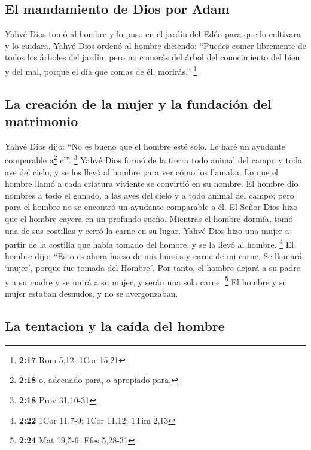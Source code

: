 \hypertarget{el-mandamiento-de-dios-por-adam}{%
\subsection{El mandamiento de Dios por
Adam}\label{el-mandamiento-de-dios-por-adam}}

 Yahvé Dios tomó al hombre y lo puso en el jardín del
Edén para que lo cultivara y lo cuidara.  Yahvé Dios
ordenó al hombre diciendo: ``Puedes comer libremente de todos los
árboles del jardín;  pero no comerás del árbol del
conocimiento del bien y del mal, porque el día que comas de él,
morirás.'' \footnote{\textbf{2:17} Rom 5,12; 1Cor 15,21}

\hypertarget{la-creaciuxf3n-de-la-mujer-y-la-fundaciuxf3n-del-matrimonio}{%
\subsection{La creación de la mujer y la fundación del
matrimonio}\label{la-creaciuxf3n-de-la-mujer-y-la-fundaciuxf3n-del-matrimonio}}

 Yahvé Dios dijo: ``No es bueno que el hombre esté solo.
Le haré un ayudante comparable a\footnote{\textbf{2:18} o, adecuado
  para, o apropiado para.} el''. \footnote{\textbf{2:18} Prov 31,10-31}
 Yahvé Dios formó de la tierra todo animal del campo y
toda ave del cielo, y se los llevó al hombre para ver cómo los llamaba.
Lo que el hombre llamó a cada criatura viviente se convirtió en su
nombre.  El hombre dio nombres a todo el ganado, a las
aves del cielo y a todo animal del campo; pero para el hombre no se
encontró un ayudante comparable a él.  El Señor Dios hizo
que el hombre cayera en un profundo sueño. Mientras el hombre dormía,
tomó una de sus costillas y cerró la carne en su lugar. 
Yahvé Dios hizo una mujer a partir de la costilla que había tomado del
hombre, y se la llevó al hombre. \footnote{\textbf{2:22} 1Cor 11,7-9;
  1Cor 11,12; 1Tim 2,13}  El hombre dijo: ``Esto es ahora
hueso de mis huesos y carne de mi carne. Se llamará `mujer', porque fue
tomada del Hombre''.  Por tanto, el hombre dejará a su
padre y a su madre y se unirá a su mujer, y serán una sola carne.
\footnote{\textbf{2:24} Mat 19,5-6; Efes 5,28-31}  El
hombre y su mujer estaban desnudos, y no se avergonzaban.

\hypertarget{la-tentacion-y-la-cauxedda-del-hombre}{%
\subsection{La tentacion y la caída del
hombre}\label{la-tentacion-y-la-cauxedda-del-hombre}}

